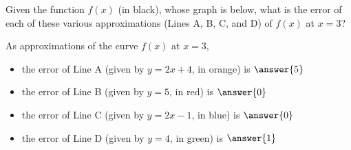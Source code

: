 \documentclass[handout,nooutcomes]{ximera}
\begin{document}
\begin{question}
Given the function $f(x)$ (in black), whose graph is below, 
what is the error of each of these various approximations
(Lines A, B, C, and D) of $f(x)$ at $x=3$?


As approximations of the curve $f(x)$ at $x=3$,\\
\begin{itemize}
\item the error of Line A (given by $y=2x+4$, in orange) is $\answer{5}$\\
\item the error of Line B (given by $y=5$, in red) is $\answer{0}$\\
\item the error of Line C (given by $y=2x-1$, in blue) is $\answer{0}$\\
\item the error of Line D (given by $y=4$, in green) is $\answer{1}$\\
\end{itemize}


\end{question}
\end{document}

